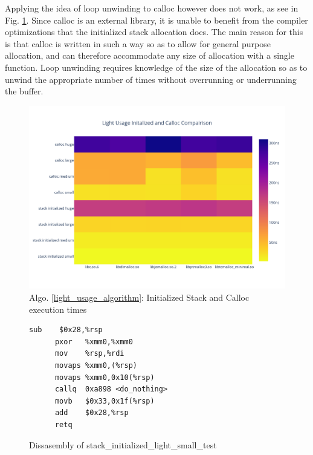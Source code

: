 \documentclass[letterpaper, 10 pt, conference]{ieeeconf}  %
\begin{document}
Applying the idea of loop unwinding to calloc however does not work, as see in Fig. \ref{algo1_init_calloc_hist}.
Since calloc is an external library, it is unable to benefit from the compiler optimizations that the initialized stack allocation does.
The main reason for this is that calloc is written in such a way so as to allow for general purpose allocation, and can therefore accommodate any size of allocation with a single function.
Loop unwinding requires knowledge of the size of the allocation so as to unwind the appropriate number of times without overrunning or underrunning the buffer. 
\begin{figure}[tbh!]
  \centering
  \includegraphics[width=\columnwidth]{graphs/light_init_calloc_hist.png}
  \caption{ Algo. \ref{light_usage_algorithm}: Initialized Stack and Calloc execution times }
  \label{algo1_init_calloc_hist}
\end{figure} 

\begin{figure}[tbh!]
  \centering
    \begin{lstlisting}[language={[x64]Assembler},frame=single]
      sub    $0x28,%rsp
      pxor   %xmm0,%xmm0
      mov    %rsp,%rdi
      movaps %xmm0,(%rsp)
      movaps %xmm0,0x10(%rsp)
      callq  0xa898 <do_nothing>
      movb   $0x33,0x1f(%rsp)
      add    $0x28,%rsp
      retq   
    \end{lstlisting}
  \caption{ Dissasembly of stack\_initialized\_light\_small\_test }
  \label{algo1_init_small_lst}
\end{figure}
\end{document}
